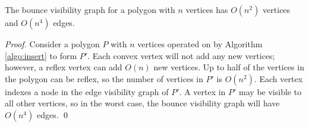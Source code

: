 \documentclass[]{styles/svproc}  %
\begin{document}
\begin{proposition} \label{prop:complexity}
The bounce visibility graph for a polygon with $n$ vertices has 
$O(n^2)$ vertices and $O(n^4)$ edges.
\end{proposition}

\begin{proof}

Consider a polygon $P$ with $n$ vertices operated on by Algorithm
\ref{algo:insert} to form $P'$. Each convex vertex will not add any new vertices; however, 
a reflex vertex can add $O(n)$ new vertices. Up to half of the vertices in the polygon 
can be reflex, so the number of vertices in $P'$ is $O(n^2)$. 
Each vertex indexes a node in the edge visibility graph of $P'$. A vertex 
in $P'$ may be visible to all other vertices, so in the worst
case, the bounce visibility graph will have $O(n^4)$ edges. \qed



\end{proof}
\end{document}
